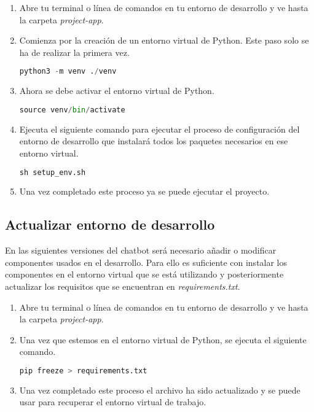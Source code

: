 \begin{enumerate}
\item Abre tu terminal o línea de comandos en tu entorno de desarrollo y ve hasta la carpeta \textit{project-app}.

\item Comienza por la creación de un entorno virtual de Python. Este paso solo se ha de realizar la primera vez.

\begin{lstlisting}[language=Python, caption=Creación de un entorno virtual.]
    python3 -m venv ./venv
\end{lstlisting}

\item Ahora se debe activar el entorno virtual de Python.

\begin{lstlisting}[language=Python, caption=Activación del entorno virtual.]
    source venv/bin/activate
\end{lstlisting}

\item Ejecuta el siguiente comando para ejecutar el proceso de configuración del entorno de desarrollo que instalará todos los paquetes necesarios en ese entorno virtual.

\begin{lstlisting}[language=Python, caption=Configuración del entorno de desarrollo.]
    sh setup_env.sh
\end{lstlisting}

\item Una vez completado este proceso ya se puede ejecutar el proyecto.  
\end{enumerate}

\subsection{Actualizar entorno de desarrollo}

En las siguientes versiones del chatbot será necesario añadir o modificar componentes usados en el desarrollo. Para ello es suficiente con instalar los componentes en el entorno virtual que se está utilizando y posteriormente actualizar los requisitos que se encuentran en \textit{requirements.txt}.

\begin{enumerate}
\item Abre tu terminal o línea de comandos en tu entorno de desarrollo y ve hasta la carpeta \textit{project-app}.

\item Una vez que estemos en el entorno virtual de Python, se ejecuta el siguiente comando.

\begin{lstlisting}[language=Python, caption=actualización de \textit{requirements.txt}.]
    pip freeze > requirements.txt
\end{lstlisting}

\item Una vez completado este proceso el archivo ha sido actualizado y se puede usar para recuperar el entorno virtual de trabajo.  
\end{enumerate}


